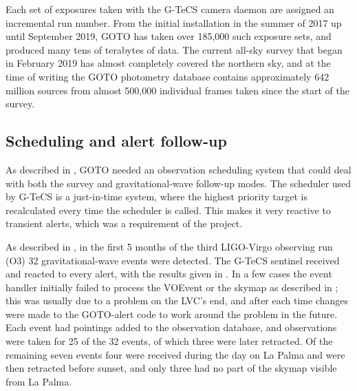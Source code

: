 \begin{colsection}
\begin{colsection}
Each set of exposures taken with the G-TeCS camera daemon are assigned an incremental run number. From the initial installation in the summer of 2017 up until September 2019, GOTO has taken over 185,000 such exposure sets, and produced many tens of terabytes of data. The current all-sky survey that began in February 2019 has almost completely covered the northern sky, and at the time of writing the GOTO photometry database contains approximately 642 million sources from almost 500,000 individual frames taken since the start of the survey.

\end{colsection}

\newpage
\subsection{Scheduling and alert follow-up}
\label{sec:gw_results}
\begin{colsection}

As described in , GOTO needed an observation scheduling system that could deal with both the survey and gravitational-wave follow-up modes. The scheduler used by G-TeCS is a just-in-time system, where the highest priority target is recalculated every time the scheduler is called. This makes it very reactive to transient alerts, which was a requirement of the project.

As described in , in the first 5 months of the third LIGO-Virgo observing run (O3) 32 gravitational-wave events were detected. The G-TeCS sentinel received and reacted to every alert, with the results given in . In a few cases the event handler initially failed to process the VOEvent or the skymap as described in ; this was usually due to a problem on the LVC's end, and after each time changes were made to the GOTO-alert code to work around the problem in the future. Each event had pointings added to the observation database, and observations were taken for 25 of the 32 events, of which three were later retracted. Of the remaining seven events four were received during the day on La Palma and were then retracted before sunset, and only three had no part of the skymap visible from La Palma.


\end{colsection}
\end{colsection}
